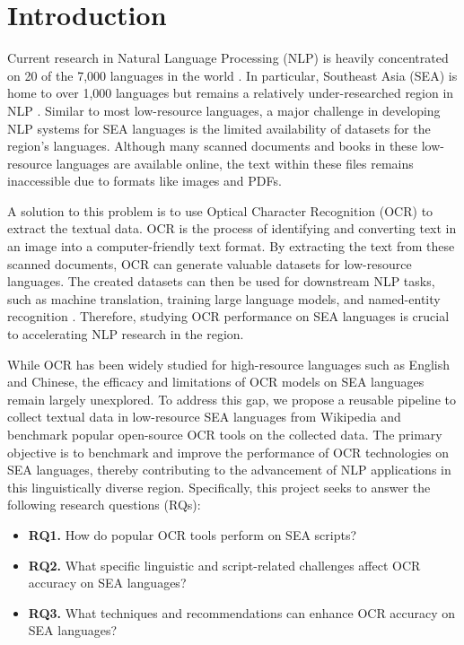 \documentclass[12pt,oneside]{memoir}
\begin{document}
\listoffigures
\listoftables
\tableofcontents

\mainmatter

\chapter{Introduction}
Current research in Natural Language Processing (NLP) is heavily concentrated on 20 of the 7,000 languages in the world \parencite{magueresse-etal-2020}.
In particular, Southeast Asia (SEA) is home to over 1,000 languages but remains a relatively under-researched region in NLP \parencite{aji-etal-2023}.
Similar to most low-resource languages, a major challenge in developing NLP systems for SEA languages is the limited availability of datasets for the region’s languages.
Although many scanned documents and books in these low-resource languages are available online, the text within these files remains inaccessible due to formats like images and PDFs.

A solution to this problem is to use Optical Character Recognition (OCR) to extract the textual data.
OCR is the process of identifying and converting text in an image into a computer-friendly text format.
By extracting the text from these scanned documents, OCR can generate valuable datasets for low-resource languages.
The created datasets can then be used for downstream NLP tasks, such as machine translation, training large language models, and named-entity recognition \parencite{agarwal-and-anastasopoulos-2024, ignat-etal-2022}.
Therefore, studying OCR performance on SEA languages is crucial to accelerating NLP research in the region.

While OCR has been widely studied for high-resource languages such as English and Chinese, the efficacy and limitations of OCR models on SEA languages remain largely unexplored.
To address this gap, we propose a reusable pipeline to collect textual data in low-resource SEA languages from Wikipedia and benchmark popular open-source OCR tools on the collected data.
The primary objective is to benchmark and improve the performance of OCR technologies on SEA languages, thereby contributing to the advancement of NLP applications in this linguistically diverse region.
Specifically, this project seeks to answer the following research questions (RQs):

\begin{itemize}
    \item \textbf{RQ1.} How do popular OCR tools perform on SEA scripts?
    \item \textbf{RQ2.} What specific linguistic and script-related challenges affect OCR accuracy on SEA languages?
    \item \textbf{RQ3.} What techniques and recommendations can enhance OCR accuracy on SEA languages?
\end{itemize}
\end{document}

